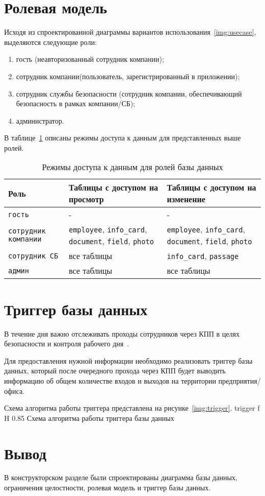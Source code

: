 \section{Ролевая модель}

Исходя из спроектированной диаграммы вариантов использования~\ref{img:usecase}, выделяются следующие роли:
\begin{enumerate}
	\item гость (неавторизованный сотрудник компании);
	\item сотрудник компании(пользователь, зарегистрированный в приложении);
	\item сотрудник службы безопасности (сотрудник компании, обеспечивающий безопасность в рамках компании/СБ);
	\item администратор.
\end{enumerate}

В таблице~\ref{table:roles} описаны режимы доступа к данным для представленных выше ролей.
\begin{table}[!ht]
	\centering
	\caption{\label{table:roles} Режимы доступа к данным для ролей базы данных}
	\begin{tabularx}{\textwidth}{|X|X|X|}
		\hline
		Роль & Таблицы с доступом на просмотр &  Таблицы с доступом на изменение \\ \hline
		\texttt{гость} & - & - \\ \hline
		\texttt{сотрудник компании} & \texttt{employee}, \texttt{info\_card}, \texttt{document}, \texttt{field}, \texttt{photo} & \texttt{employee}, \texttt{info\_card}, \texttt{document}, \texttt{field}, \texttt{photo} \\ \hline
		\texttt{сотрудник СБ} & все таблицы & \texttt{info\_card}, \texttt{passage} \\ \hline
		\texttt{админ} & все таблицы & все таблицы \\ \hline
	\end{tabularx}
\end{table}

\section{Триггер базы данных}

В течение дня важно отслеживать проходы сотрудников через КПП в целях безопасности и контроля рабочего дня~\cite{introCPP}.

Для предоставления нужной информации необходимо реализовать триггер базы данных, который после очередного прохода через КПП будет выводить информацию об общем количестве входов и выходов на территории предприятия/офиса.

Схема алгоритма работы триггера представлена на рисунке~\ref{img:trigger}.
	{trigger}
	{f}
	{H}
	{0.85\textwidth}
	{Схема алгоритма работы триггера базы данных}

\section*{Вывод}

В конструкторском разделе были спроектированы диаграмма базы данных, ограничения целостности, ролевая модель и триггер базы данных.